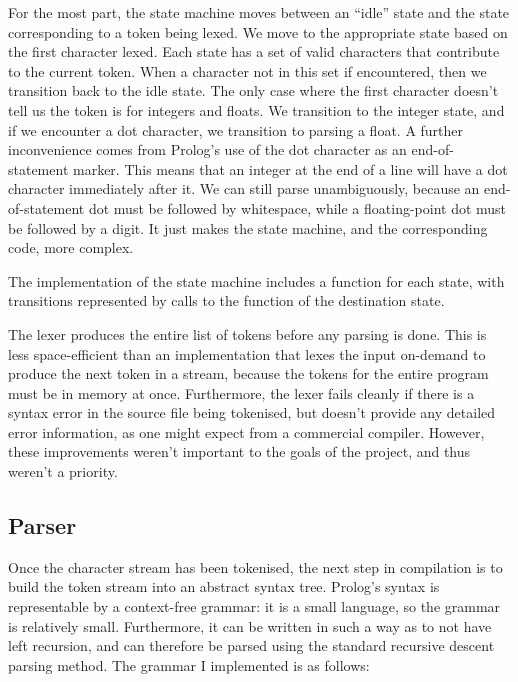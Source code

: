 \documentclass[12pt]{article}
\begin{document}
\newpage

For the most part, the state machine moves between an ``idle'' state and the state corresponding to a token being lexed. 
We move to the appropriate state based on the first character lexed. 
Each state has a set of valid characters that contribute to the current token. 
When a character not in this set if encountered, then we transition back to the idle state.
The only case where the first character doesn't tell us the token is for integers and floats. 
We transition to the integer state, and if we encounter a dot character, we transition to parsing a float.
A further inconvenience comes from Prolog's use of the dot character as an end-of-statement marker. 
This means that an integer at the end of a line will have a dot character immediately after it. 
We can still parse unambiguously, because an end-of-statement dot must be followed by whitespace, while a floating-point dot must be followed by a digit. 
It just makes the state machine, and the corresponding code, more complex.

The implementation of the state machine includes a function for each state, with transitions represented by calls to the function of the destination state.

The lexer produces the entire list of tokens before any parsing is done. 
This is less space-efficient than an implementation that lexes the input on-demand to produce the next token in a stream, because the tokens for the entire program must be in memory at once. 
Furthermore, the lexer fails cleanly if there is a syntax error in the source file being tokenised, but doesn't provide any detailed error information, as one might expect from a commercial compiler. 
However, these improvements weren't important to the goals of the project, and thus weren't a priority.

\subsection{Parser}

Once the character stream has been tokenised, the next step in compilation is to build the token stream into an abstract syntax tree. 
Prolog's syntax is representable by a context-free grammar: it is a small language, so the grammar is relatively small. 
Furthermore, it can be written in such a way as to not have left recursion, and can therefore be parsed using the standard recursive descent parsing method. 
The grammar I implemented is as follows:
\end{document}
